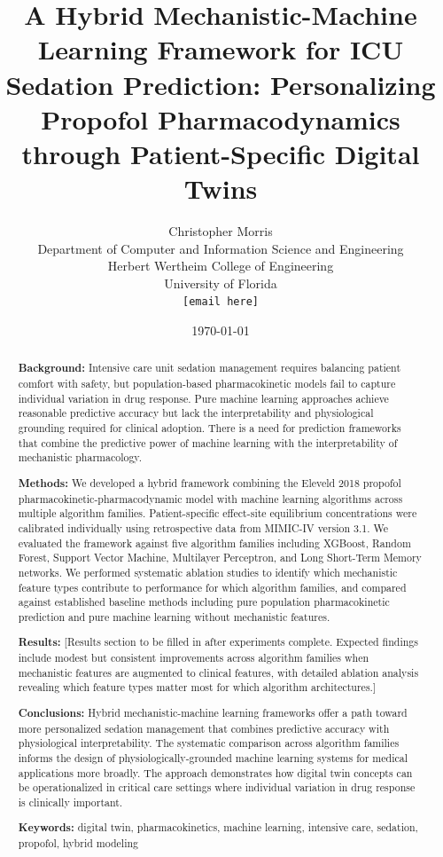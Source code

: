 \documentclass[11pt,a4paper]{article}
\title{A Hybrid Mechanistic-Machine Learning Framework for ICU Sedation Prediction: Personalizing Propofol Pharmacodynamics through Patient-Specific Digital Twins}
\author{
    Christopher Morris \\
    Department of Computer and Information Science and Engineering \\
    Herbert Wertheim College of Engineering \\
    University of Florida \\
    \texttt{[email here]}
}
\date{\today}
\begin{document}
\maketitle


\begin{abstract}
\noindent\textbf{Background:} Intensive care unit sedation management requires balancing patient comfort with safety, but population-based pharmacokinetic models fail to capture individual variation in drug response. Pure machine learning approaches achieve reasonable predictive accuracy but lack the interpretability and physiological grounding required for clinical adoption. There is a need for prediction frameworks that combine the predictive power of machine learning with the interpretability of mechanistic pharmacology.

\noindent\textbf{Methods:} We developed a hybrid framework combining the Eleveld 2018 propofol pharmacokinetic-pharmacodynamic model with machine learning algorithms across multiple algorithm families. Patient-specific effect-site equilibrium concentrations were calibrated individually using retrospective data from MIMIC-IV version 3.1. We evaluated the framework against five algorithm families including XGBoost, Random Forest, Support Vector Machine, Multilayer Perceptron, and Long Short-Term Memory networks. We performed systematic ablation studies to identify which mechanistic feature types contribute to performance for which algorithm families, and compared against established baseline methods including pure population pharmacokinetic prediction and pure machine learning without mechanistic features.

\noindent\textbf{Results:} [Results section to be filled in after experiments complete. Expected findings include modest but consistent improvements across algorithm families when mechanistic features are augmented to clinical features, with detailed ablation analysis revealing which feature types matter most for which algorithm architectures.]

\noindent\textbf{Conclusions:} Hybrid mechanistic-machine learning frameworks offer a path toward more personalized sedation management that combines predictive accuracy with physiological interpretability. The systematic comparison across algorithm families informs the design of physiologically-grounded machine learning systems for medical applications more broadly. The approach demonstrates how digital twin concepts can be operationalized in critical care settings where individual variation in drug response is clinically important.

\noindent\textbf{Keywords:} digital twin, pharmacokinetics, machine learning, intensive care, sedation, propofol, hybrid modeling
\end{abstract}
\end{document}
